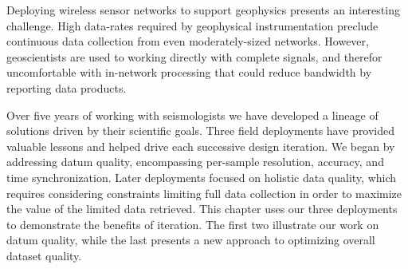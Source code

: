 Deploying wireless sensor networks to support geophysics presents an
interesting challenge. High data-rates required by geophysical
instrumentation preclude continuous data collection from even
moderately-sized networks. However, geoscientists are used to working
directly with complete signals, and therefor uncomfortable with in-network
processing that could reduce bandwidth by reporting data products.

Over five years of working with seismologists we have developed a lineage of
solutions driven by their scientific goals. Three field deployments have
provided valuable lessons and helped drive each successive design iteration.
We began by addressing datum quality, encompassing per-sample resolution,
accuracy, and time synchronization.  Later deployments focused on holistic
data quality, which requires considering constraints limiting full data
collection in order to maximize the value of the limited data retrieved. This
chapter uses our three deployments to demonstrate the benefits of iteration.
The first two illustrate our work on datum quality, while the last presents a
new approach to optimizing overall dataset quality.
